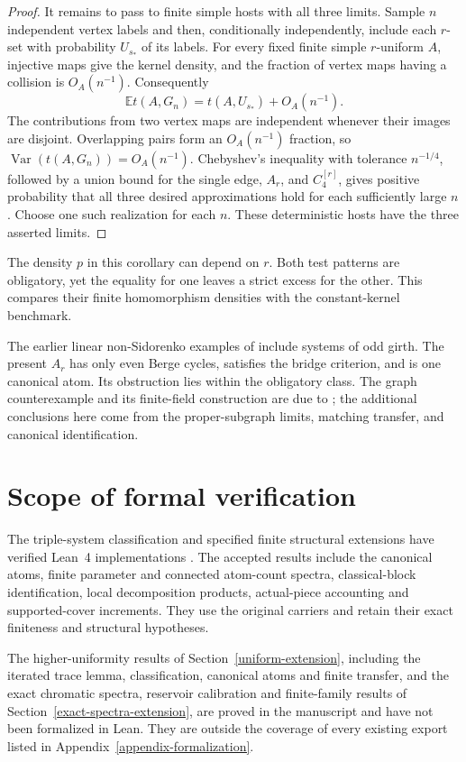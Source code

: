 \documentclass[a4paper,11pt,reqno]{amsart}
\theoremstyle{plain}
\theoremstyle{definition}
\theoremstyle{remark}
\begin{document}
\begin{proof}
It remains to pass to finite simple hosts with all three limits.
Sample $n$ independent vertex labels and then, conditionally
independently, include each $r$-set with probability $U_{s_*}$ of
its labels.  For every fixed finite simple $r$-uniform $A$,
injective maps give the kernel density, and the fraction of vertex
maps having a collision is $O_A(n^{-1})$.  Consequently
\[
 \mathbb E t(A,G_n)=t(A,U_{s_*})+O_A(n^{-1}).
\]
The contributions from two vertex maps are independent whenever
their images are disjoint.  Overlapping pairs form an
$O_A(n^{-1})$ fraction, so
$\operatorname{Var}(t(A,G_n))=O_A(n^{-1})$.
Chebyshev's inequality with tolerance $n^{-1/4}$, followed by a
union bound for the single edge, $A_r$, and $C_4^{[r]}$, gives
positive probability that all three desired approximations hold
for each sufficiently large $n$.
Choose one such realization for each $n$.
These deterministic hosts have the three asserted limits.
\end{proof}


The density $p$ in this corollary can depend on $r$.  Both test
patterns are obligatory, yet the equality for one leaves a strict
excess for the other.  This compares their finite homomorphism
densities with the constant-kernel benchmark.

The earlier linear non-Sidorenko examples of
\citet[Theorem~3.1]{conlonleesidorenko2024} include systems of odd
girth.  The present $A_r$ has only even Berge cycles, satisfies the
bridge criterion, and is one canonical atom.  Its obstruction lies
within the obligatory class.  The graph counterexample and its
finite-field construction are due to \citet{openai161}; the
additional conclusions here come from the proper-subgraph limits,
matching transfer, and canonical identification.

\section*{Scope of formal verification}

The triple-system classification and specified finite structural extensions have verified
Lean~4 implementations \citep{demoura2021,mathlib2020}.  The accepted results
include the canonical atoms, finite parameter and connected atom-count spectra,
classical-block identification, local decomposition products, actual-piece
accounting and supported-cover increments.  They use the original carriers
and retain their exact finiteness and structural hypotheses.

The higher-uniformity results of Section~\ref{uniform-extension},
including the iterated trace lemma, classification, canonical atoms and
finite transfer, and the exact chromatic spectra, reservoir calibration
and finite-family results of Section~\ref{exact-spectra-extension},
are proved in the manuscript and have not been formalized in Lean.
They are outside the coverage of every existing
export listed in Appendix~\ref{appendix-formalization}.
\end{document}
